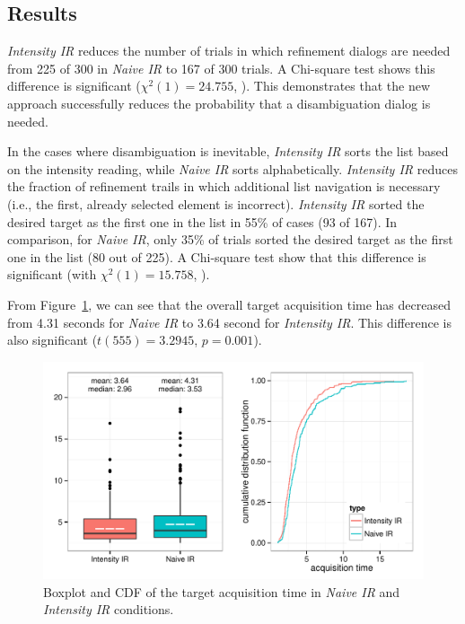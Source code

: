 \subsection{Results}
{\em Intensity IR} reduces the number of trials in which refinement dialogs are needed from 225 of 300 in {\em Naive IR} to 167 of 300 trials. A Chi-square test shows this difference is significant ($\chi^2(1) = 24.755$, ). This demonstrates that the new approach successfully reduces the probability that a disambiguation dialog is needed.

In the cases where disambiguation is inevitable, {\em Intensity IR} sorts the list based on the intensity reading, while {\em Naive IR} sorts alphabetically. {\em Intensity IR} reduces the fraction of refinement trails in which additional list navigation is necessary (i.e., the first, already selected element is incorrect).  {\em Intensity IR} sorted the desired target as the first one in the list in 55\% of cases (93 of 167). In comparison, for {\em Naive IR}, only 35\% of trials sorted the desired target as the first one in the list (80 out of 225). A Chi-square test show that this difference is significant (with $\chi^2(1) = 15.758$, ).

From Figure~\ref{fig:study2}, we can see that the overall target acquisition time has decreased from 4.31 seconds for {\em Naive IR} to 3.64 second for {\em Intensity IR}. This difference is also significant ($t(555)=3.2945$, $p=0.001$).




\begin{figure}[t]
\centering
\includegraphics[width=1.0\columnwidth]{figures/result_study2.pdf}
\caption{Boxplot and CDF of the target acquisition time in {\em Naive IR} and {\em Intensity IR} conditions.}
\label{fig:study2}
\end{figure}

